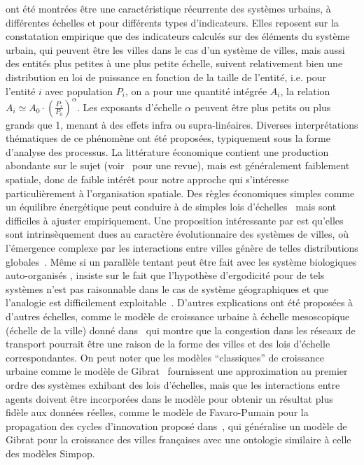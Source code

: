 { ont été montrées être une caractéristique récurrente des systèmes urbains, à différentes échelles et pour différents types d'indicateurs. Elles reposent sur la constatation empirique que des indicateurs calculés sur des éléments du système urbain, qui peuvent être les villes dans le cas d'un système de villes, mais aussi des entités plus petites à une plus petite échelle, suivent relativement bien une distribution en loi de puissance en fonction de la taille de l'entité, i.e. pour l'entité $i$ avec population $P_i$, on a pour une quantité intégrée $A_i$, la relation $A_i \simeq A_0\cdot \left(\frac{P_i}{P_0}\right)^{\alpha}$. Les exposants d'échelle $\alpha$ peuvent être plus petits ou plus grands que 1, menant à des effets infra ou supra-linéaires. Diverses interprétations thématiques de ce phénomène ont été proposées, typiquement sous la forme d'analyse des processus. La littérature économique contient une production abondante sur le sujet (voir~\cite{Gabaix20042341} pour une revue), mais est généralement faiblement spatiale, donc de faible intérêt pour notre approche qui s'intéresse particulièrement à l'organisation spatiale. Des règles économiques simples comme un équilibre énergétique peut conduire à de simples lois d'échelles~\cite{bettencourt2008large} mais sont difficiles à ajuster empiriquement. Une proposition intéressante par  est qu'elles sont intrinsèquement dues au caractère évolutionnaire des systèmes de villes, où l'émergence complexe par les interactions entre villes génère de telles distributions globales~\cite{pumain2006evolutionary}. Même si un parallèle tentant peut être fait avec les système biologiques auto-organisés 
 ,  insiste sur le fait que l'hypothèse d'ergodicité 
  pour de tels systèmes n'est pas raisonnable dans le cas de système géographiques et que l'analogie est difficilement exploitable~\cite{pumain2012urban}. D'autres explications ont été proposées à d'autres échelles, comme le modèle de croissance urbaine à échelle mesoscopique (échelle de la ville) donné dans~\cite{2014arXiv1401.8200L} qui montre que la congestion dans les réseaux de transport pourrait être une raison de la forme des villes et des lois d'échelle correspondantes. On peut noter que les modèles ``classiques'' de croissance urbaine comme le modèle de Gibrat~\cite{favaro2011gibrat} fournissent une approximation au premier ordre des systèmes %
  exhibant des lois d'échelles, mais que les interactions entre agents doivent être incorporées dans le modèle pour obtenir un résultat plus fidèle aux données réelles, comme le modèle de Favaro-Pumain pour la propagation des cycles d'innovation proposé dans~\cite{favaro2011gibrat}, qui généralise un modèle de Gibrat pour la croissance des villes françaises avec une ontologie similaire à celle des modèles Simpop.
}


